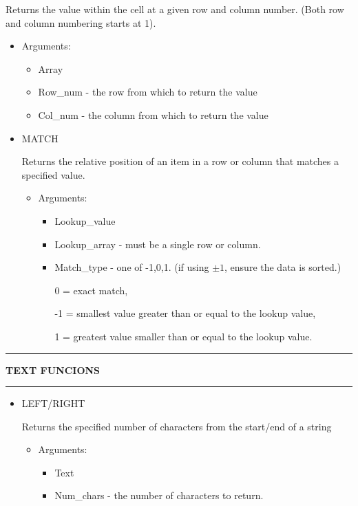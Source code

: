\documentclass[8pt]{extarticle}
\newcommand{\heading}[1]{%
    \noindent
    \rule{\linewidth}{0.4pt}
    \begin{center}
        \vspace{-1ex}
        \textbf{#1}        
        \vspace{-2.5ex}
    \end{center}
    \rule{\linewidth}{0.4pt}
}
\begin{document}
\begin{multicols}{3}
\begin{itemize}
    Returns the value within the cell at a given row and column number. (Both row and column numbering starts at 1).
    \begin{itemize}
        \item Arguments:
        \begin{itemize}
            \item Array 
            \item Row\_num - the row from which to return the value
            \item Col\_num - the column from which to return the value
        \end{itemize}
    \end{itemize}
\end{itemize}

\columnbreak
\begin{itemize}
    \item MATCH 
    
    Returns the relative position of an item in a row or column that matches a specified value.
    \begin{itemize}
        \item Arguments:
        \begin{itemize}
            \item Lookup\_value
            \item Lookup\_array - must be a single row or column.
            \item Match\_type - one of -1,0,1. (if using $\pm 1$, ensure the data is sorted.)
            
            0 = exact match, 
            
            -1 = smallest value greater than or equal to the lookup value, 
            
            1 = greatest value smaller than or equal to the lookup value.
        \end{itemize}
    \end{itemize}
\end{itemize}

\heading{TEXT FUNCIONS}

\begin{itemize}
    \item LEFT/RIGHT
    
    Returns the specified number of characters from the start/end of a string
    \begin{itemize}
        \item Arguments:
        \begin{itemize}
            \item Text
            \item Num\_chars - the number of characters to return.
        \end{itemize}
    \end{itemize}
\end{itemize}


\end{multicols}
\end{document}
